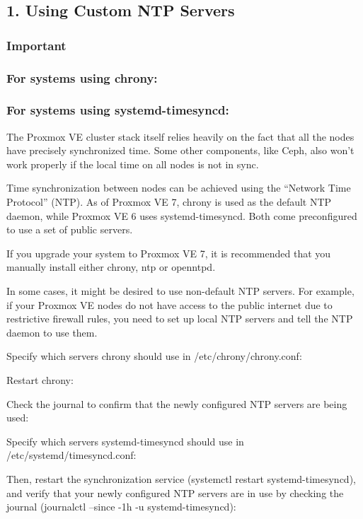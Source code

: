 \subsection{1. Using Custom NTP Servers}

\subsubsection{Important}

\subsubsection{For systems using chrony:}

\subsubsection{For systems using systemd-timesyncd:}

The Proxmox VE cluster stack itself relies heavily on the fact that all the nodes have precisely synchronized time. Some other components, like Ceph, also won’t work properly if the local time on all nodes is not in sync.

Time synchronization between nodes can be achieved using the “Network Time Protocol” (NTP). As of Proxmox VE 7, chrony is used as the default NTP daemon, while Proxmox VE 6 uses systemd-timesyncd. Both come preconfigured to use a set of public servers.

If you upgrade your system to Proxmox VE 7, it is recommended that you manually install either chrony, ntp or openntpd.

In some cases, it might be desired to use non-default NTP servers. For example, if your Proxmox VE nodes do not have access to the public internet due to restrictive firewall rules, you need to set up local NTP servers and tell the NTP daemon to use them.

Specify which servers chrony should use in /etc/chrony/chrony.conf:

Restart chrony:

Check the journal to confirm that the newly configured NTP servers are being used:

Specify which servers systemd-timesyncd should use in /etc/systemd/timesyncd.conf:

Then, restart the synchronization service (systemctl restart systemd-timesyncd), and verify that your newly configured NTP servers are in use by checking the journal (journalctl --since -1h -u systemd-timesyncd):

